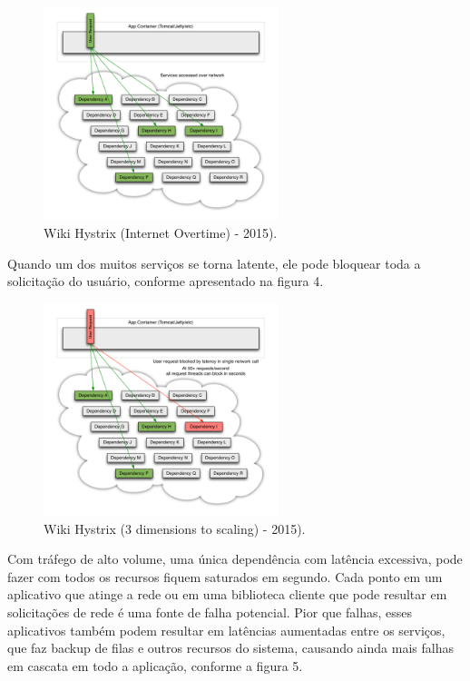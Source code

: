 \begin{figure}[h]
\centering
\includegraphics[height=6.2cm]{imagens/figura3}
\caption{Wiki Hystrix (Internet Overtime) - 2015).}
\label{fig:exemplo}
\end{figure}

Quando um dos muitos serviços se torna latente, ele pode bloquear toda a solicitação do usuário, conforme apresentado na figura 4.

\begin{figure}[h]
\centering
\includegraphics[height=6.2cm]{imagens/figura4}
\caption{Wiki Hystrix (3 dimensions to scaling) - 2015).}
\label{fig:exemplo}
\end{figure}

Com tráfego de alto volume, uma única dependência com latência excessiva, pode fazer com todos os recursos fiquem saturados em segundo. Cada ponto em um aplicativo que atinge a rede ou em uma biblioteca cliente que pode resultar em solicitações de rede é uma fonte de falha potencial. Pior que falhas, esses aplicativos também podem resultar em latências aumentadas entre os serviços, que faz backup de filas e outros recursos do sistema, causando ainda mais falhas em cascata em todo a aplicação, conforme a figura 5.

